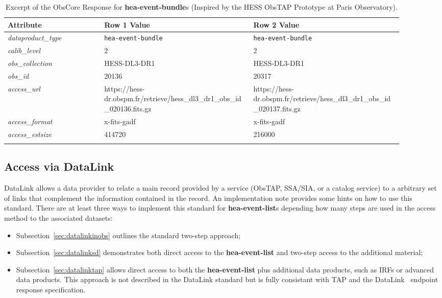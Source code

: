 \begin{longtable}{|m{0.22\linewidth}|m{0.34\linewidth}|m{0.34\linewidth}|}
\hline
{\bf Attribute}&{\bf Row 1 Value}&{\bf Row 2 Value}\\
\hline
{\em dataproduct\_type\/}& {\tt hea-event-bundle}&{\tt hea-event-bundle}\\
\hline
{\em calib\_level\/}& 2&2\\
\hline
{\em obs\_collection\/}& HESS-DL3-DR1&HESS-DL3-DR1\\
\hline
{\em obs\_id\/}&20136&20317\\
\hline
{\em access\_url\/}& \footnotesize{https://hess-dr.obspm.fr/\newline retrieve/hess\_dl3\_dr1\_obs\newline\_id\_020136.fits.gz}&\footnotesize{https://hess-dr.obspm.fr/\newline retrieve/hess\_dl3\_dr1\_obs\newline\_id\_020137.fits.gz}\\
\hline
{\em access\_format\/}&x-fits-gadf&x-fits-gadf\\
\hline
{\em access\_estsize\/}&414720&216000\\
\hline
\caption{Excerpt of the ObsCore Response for {\bf hea-event-bundle}s (Inspired by the \gls{HESS} ObsTAP Prototype at Paris Observatory).}
\label{tab:bundle}
\end{longtable}

\subsection{Access via DataLink}
\label{sec:datalink}


DataLink \citep{2023ivoa.spec.1215B} allows a data provider to relate a main record provided by a service (ObsTAP, SSA/SIA, or a catalog service) to a arbitrary set of links that complement the information contained in the record. An implementation note \citep{2024ivoa.note.datalink} provides some hints on how to use this standard.
There are at least three ways to implement this standard for {\bf hea-event-list}s depending how many steps are used in the access method to the associated datasets:
 \begin{itemize}
	\item Subsection~\ref{sec:datalinkinobs} outlines the standard two-step approach;
	\item Subsection~\ref{sec:datalinksd} demonstrates both direct access to the {\bf hea-event-list} and two-step access to the additional material;
 	\item Subsection~\ref{sec:datalinktap} allows direct access to both the {\bf hea-event-list} plus additional data products, such as \glspl{IRF} or advanced data products.  This approach is not described in the DataLink standard but is fully consistant with TAP and the DataLink \blinks\ endpoint response specification.
 \end{itemize}
	 
